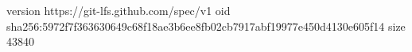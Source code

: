 version https://git-lfs.github.com/spec/v1
oid sha256:5972f7f363630649c68f18ae3b6ee8fb02cb7917abf19977e450d4130e605f14
size 43840
